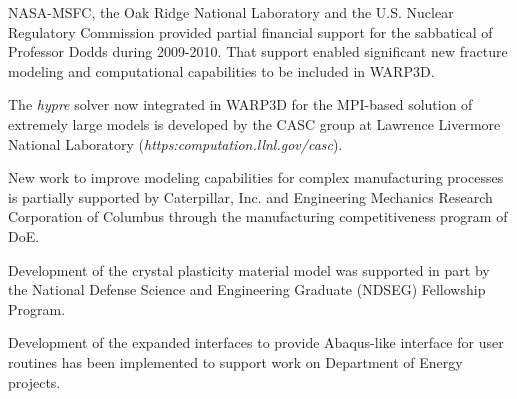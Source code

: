 \documentclass[10pt]{report}
\newcommand{\ti}{\emph}
\begin{document}
NASA-MSFC, the Oak Ridge National Laboratory and the U.S. Nuclear 
Regulatory Commission provided partial financial support for the 
sabbatical of Professor Dodds during 2009-2010. That support 
enabled significant new fracture modeling and computational 
capabilities to be included in WARP3D.

The \ti{hypre} solver now integrated in WARP3D for the 
MPI-based solution of extremely large models 
is developed by the CASC group at Lawrence Livermore National Laboratory
(\ti{https:computation.llnl.gov/casc}).

New work to improve modeling capabilities for complex manufacturing processes
is partially supported by Caterpillar, Inc. and Engineering Mechanics 
Research Corporation of Columbus 
through the manufacturing competitiveness program of DoE.

Development of the crystal plasticity material model was supported in part by the
National Defense Science and Engineering Graduate (NDSEG) Fellowship Program.

Development of the expanded interfaces to provide Abaqus-like interface for user routines 
has been implemented to support work on Department of Energy projects. 
\end{document}
